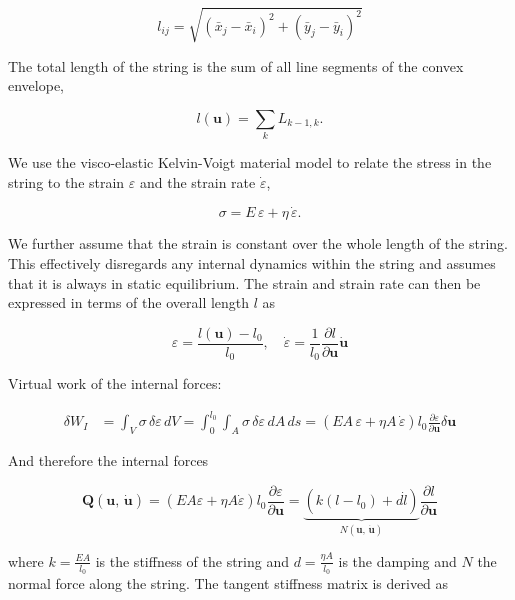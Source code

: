\begin{equation}
l_{ij} = \sqrt{(\bar{x}_j - \bar{x}_i)^2 + (\bar{y}_j - \bar{y}_i)^2}
\end{equation}

The total length of the string is the sum of all line segments of the convex envelope,

\begin{equation}
l(\boldsymbol{u}) = \sum_{k} L_{k-1,k}.
\end{equation}

We use the visco-elastic Kelvin-Voigt material model to relate the stress in the string to the strain $\varepsilon$ and the strain rate $\dot{\varepsilon}$,

\begin{equation}
\sigma = E\,\varepsilon + \eta\,\dot{\varepsilon}.
\end{equation}

We further assume that the strain is constant over the whole length of the string.
This effectively disregards any internal dynamics within the string and assumes that it is always in static equilibrium.
The strain and strain rate can then be expressed in terms of the overall length $l$ as

\begin{equation}
\varepsilon = \frac{l(\boldsymbol{u}) - l_{0}}{l_{0}}, \quad \dot{\varepsilon} = \frac{1}{l_{0}}\frac{\partial l}{\partial \boldsymbol{u}}\dot{\boldsymbol{u}}
\end{equation}

Virtual work of the internal forces:

\begin{align}
\delta W_{I} &= \int_{V} \sigma\,\delta\varepsilon\,dV = \int_{0}^{l_{0}}\int_{A} \sigma\,\delta\varepsilon\,dA\,ds = \left(EA\,\varepsilon + \eta A\,\dot{\varepsilon}\right)l_{0}\frac{\partial\varepsilon}{\partial\boldsymbol{u}}\delta\boldsymbol{u}
\end{align}

And therefore the internal forces

\begin{equation}
\boldsymbol{Q}(\boldsymbol{u},\,\dot{\boldsymbol{u}}) = \left(EA\varepsilon + \eta A\dot{\varepsilon}\right)l_{0}\frac{\partial\varepsilon}{\partial\boldsymbol{u}} = \underbrace{\left(k(l - l_{0}) + d\dot{l}\right)}_{N(\boldsymbol{u},\,\dot{\boldsymbol{u}})}\frac{\partial l}{\partial\boldsymbol{u}}
\end{equation}

where $k = \frac{EA}{l_{0}}$ is the stiffness of the string and $d = \frac{\eta A}{l_{0}}$ is the damping and $N$ the normal force along the string.
The tangent stiffness matrix is derived as

